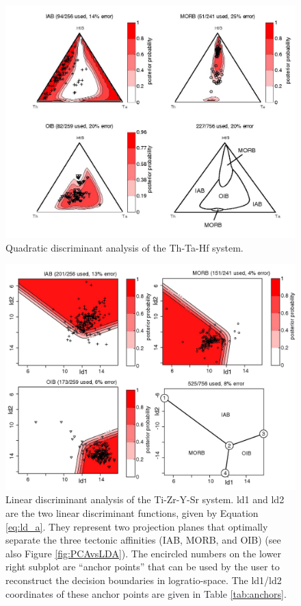 \begin{figure}[htbp]
  \centering
  \includegraphics[width=600]{figures/Th_Ta_Hf_quad.jpg}
  \caption[Quadratic discriminant analysis of the Th-Ta-Hf system]
{Quadratic discriminant analysis of the Th-Ta-Hf system.}
  \label{fig:Th_Ta_Hf_quad}
\end{figure}

\clearpage

\begin{figure}[htbp]
  \centering
  \includegraphics[width=600]{figures/discrimiFunc2.jpg}
  \caption[Linear discriminant analysis using Ti, Zr, Y and Sr]{
Linear discriminant analysis of the Ti-Zr-Y-Sr system. ld1 and ld2 are
the   two   linear   discriminant   functions,   given   by   Equation
\ref{eq:ld_a}.   They represent two  projection planes  that optimally
separate the three tectonic affinities  (IAB, MORB, and OIB) (see also
Figure \ref{fig:PCAvsLDA}).  The encircled  numbers on the lower right
subplot  are  ``anchor  points'' that  can  be  used  by the  user  to
reconstruct  the decision boundaries  in logratio-space.   The ld1/ld2
coordinates   of   these   anchor    points   are   given   in   Table
\ref{tab:anchors}.}
  \label{fig:discrimiFunc1}
\end{figure}

